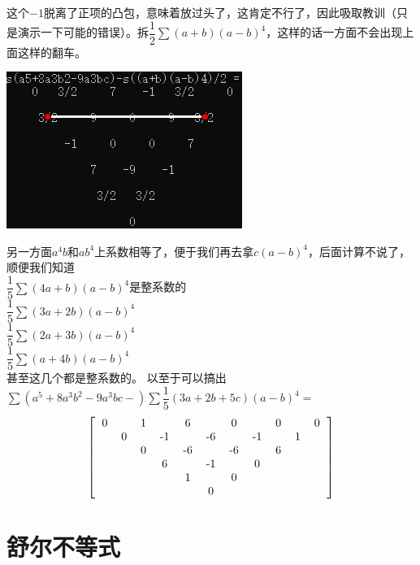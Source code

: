 \documentclass[UTF8]{ctexart}
\begin{document}
这个$ -1 $脱离了正项的凸包，意味着放过头了，这肯定不行了，因此吸取教训（只是演示一下可能的错误）。拆$ \dfrac{1}{2}\displaystyle \sum (a+b)(a-b)^4 $，这样的话一方面不会出现上面这样的翻车。
  \begin{center}
  	\includegraphics[width=0.4\linewidth]{200}
  \end{center}
另一方面$ a^{4}b $和$ ab^{4} $上系数相等了，便于我们再去拿$ c(a-b)^{4} $，后面计算不说了，顺便我们知道 \\
$ \dfrac{1}{5} \displaystyle \sum (4a+b)(a-b)^{4} $是整系数的\\
$ \dfrac{1}{5} \displaystyle \sum (3a+2b)(a-b)^{4} $\\
$ \dfrac{1}{5} \displaystyle \sum (2a+3b)(a-b)^{4} $\\
$ \dfrac{1}{5} \displaystyle \sum (a+4b)(a-b)^{4} $\\
甚至这几个都是整系数的。
以至于可以搞出$  \displaystyle \sum (a^{5}+8 a^{3} b^{2}-9a^{3}bc-) \displaystyle \sum \dfrac{1}{5}(3a+2b+5c)(a-b)^{4}= $
  \renewcommand*{\arraystretch}{1.732}\[\left[\begin{matrix}
  	\begin{tabular}{ccccccccccccc}
  		0& &1& &6& &0& &0& &0\\
  		&0& &-1& &-6& &-1& &1&\\
  		& &0& &-6& &-6& &6& &\\
  		& & &6& &-1& &0& & &\\
  		& & & &1& &0& & & &\\
  		& & & & &0& & & & &\\
  	\end{tabular}
  \end{matrix}\right]\]
\section{舒尔不等式}
\end{document}
